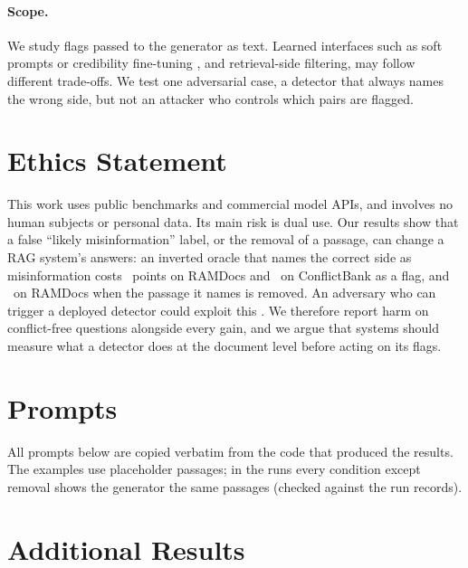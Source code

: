 \paragraph{Scope.} We study flags passed to the generator as text. Learned interfaces such as soft prompts or
credibility fine-tuning \citep{ye2026tcr,pan2024credibility}, and retrieval-side filtering, may follow different
trade-offs. We test one adversarial case, a detector that always names the wrong side, but not an attacker who controls
which pairs are flagged.

\section*{Ethics Statement}
This work uses public benchmarks and commercial model APIs, and involves no human subjects or personal data. Its main
risk is dual use. Our results show that a false ``likely misinformation'' label, or the removal of a passage, can
change a RAG system's answers: an inverted oracle that names the correct side as misinformation costs \aadvDirConf\
points on RAMDocs and \azCbMiniOracleInvFlagDirectionalConflict\ on ConflictBank as a flag, and \aadvRemConf\ on RAMDocs
when the passage it names is removed. An adversary who can trigger a deployed detector could exploit this
\citep{zou2025poisonedrag}. We therefore report harm on conflict-free questions alongside every gain, and we argue that
systems should measure what a detector does at the document level before acting on its flags.
\section{Prompts}
\label{app:prompts}
All prompts below are copied verbatim from the code that produced the results. The examples use placeholder passages; in the runs every condition except removal shows the generator the same passages (checked against the run records).


\section{Additional Results}
\label{app:extra}

